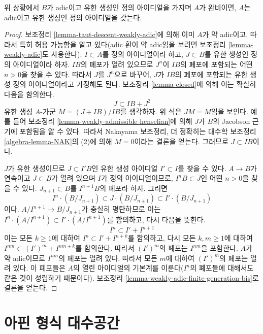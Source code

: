 \begin{lemma}
\label{lemma-taut-descent-adic-star}
위 상황에서 $B$가 adic이고 유한 생성인 정의 아이디얼을 가지며
$A$가 완비이면, $A$는 adic이고 유한 생성인 정의 아이디얼을 갖는다.
\end{lemma}

\begin{proof}
보조정리 \ref{lemma-taut-descent-weakly-adic}에 의해 이미 $A$가
약 adic이고, 따라서 특히 허용 가능함을 알고 있다(adic 환이 약
adic임을 보려면 보조정리 \ref{lemma-weakly-adic}도 사용한다).
$I \subset A$를 정의 아이디얼이라 하고, $J \subset B$를 유한 생성인
정의 아이디얼이라 하자. $IB$의 폐포가 열려 있으므로 $J^n$이
$IB$의 폐포에 포함되는 어떤 $n > 0$을 찾을 수 있다. 따라서 $J$를
$J^n$으로 바꾸어, $J$가 $IB$의 폐포에 포함되는 유한 생성 정의
아이디얼이라고 가정해도 된다. 보조정리 \ref{lemma-closed}에 의해
이는 확실히 다음을 함의한다.
$$
J \subset IB + J^2
$$
유한 생성 $A$-가군 $M = (J + IB)/IB$를 생각하자. 위 식은
$JM = M$임을 보인다. 예를 들어 보조정리
\ref{lemma-weakly-admissible-henselian}에 의해 $J$가 $B$의 Jacobson
근기에 포함됨을 알 수 있다. 따라서 Nakayama 보조정리, 더 정확히는
대수학 보조정리 \ref{algebra-lemma-NAK}의 (2)에 의해 $M = 0$이라는
결론을 얻는다. 그러므로 $J \subset IB$이다.

\medskip\noindent
$J$가 유한 생성이므로 $J \subset I'B$인 유한 생성 아이디얼
$I' \subset I$를 찾을 수 있다. $A \to B$가 연속이고 $J \subset B$가
열려 있으며 $I$가 정의 아이디얼이므로, $I^nB \subset J$인
어떤 $n > 0$을 찾을 수 있다. $J_{n + 1} \subset B$를
$I^{n + 1}B$의 폐포라 하자. 그러면
$$
I^n \cdot (B/J_{n + 1}) \subset J \cdot (B/J_{n + 1}) \subset
I' \cdot (B/J_{n + 1})
$$
이다. $A/I^{n + 1} \to B/J_{n + 1}$가 충실히 평탄하므로 이는
$I^n \cdot (A/I^{n + 1}) \subset I' \cdot (A/I^{n + 1})$를
함의하고, 다시 다음을 뜻한다.
$$
I^n \subset I' + I^{n + 1}
$$
이는 모든 $k \geq 1$에 대하여 $I^n \subset I'  + I^{n + k}$를
함의하고, 다시 모든 $k, m \geq 1$에 대하여
$I^{nm} \subset (I')^m + I^{nm + k}$를 함의한다. 따라서
$(I')^m$의 폐포는 $I^{nm}$을 포함한다. $A$가 약 adic이므로
$I^{nm}$의 폐포는 열려 있다.
따라서 모든 $m$에 대하여 $(I')^m$의 폐포는 열려 있다. 이 폐포들은
$A$의 열린 아이디얼의 기본계를 이룬다($I^n$의 폐포들에 대해서도
같은 것이 성립하기 때문이다). 보조정리
\ref{lemma-weakly-adic-finite-generation-bis}로 결론을 얻는다.
\end{proof}






\section{아핀 형식 대수공간}
\label{section-affine-formal-algebraic-spaces}

